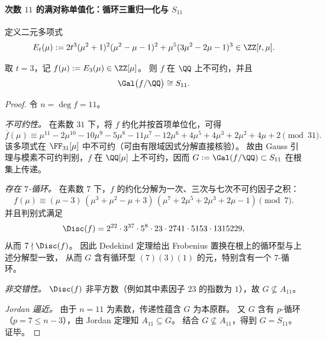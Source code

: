 \paragraph{次数 \texorpdfstring{$11$}{11} 的满对称单值化：循环三重归一化与 \texorpdfstring{$S_{11}$}{S11}}
定义二元多项式
\[
E_t(\mu):=
2t^3(\mu^2+1)^2(\mu^2-\mu-1)^2+\mu^5(3\mu^2-2\mu-1)^3\in\ZZ[t,\mu].
\]

\begin{theorem}\label{thm:xi-degree11-Et-specialization-galois-S11}
取 \(t=3\)，记 \(f(\mu):=E_3(\mu)\in\ZZ[\mu]\)。
则 \(f\) 在 \(\QQ\) 上不可约，并且
\[
\Gal\bigl(f/\QQ\bigr)\cong S_{11}.
\]
\end{theorem}
\begin{proof}
令 \(n=\deg f=11\)。
\par
\emph{不可约性。}
在素数 \(31\) 下，将 \(f\) 约化并按首项单位化，可得
\[
\overline f(\mu)\equiv \mu^{11}-2\mu^{10}-10\mu^9-5\mu^8-11\mu^7-12\mu^6+4\mu^5+4\mu^3+2\mu^2+4\mu+2\pmod{31}.
\]
该多项式在 \(\FF_{31}[\mu]\) 中不可约（可由有限域因式分解直接核验）。
故由 Gauss 引理与模素不可约判别，\(f\) 在 \(\QQ[\mu]\) 上不可约，因而 \(G:=\Gal(f/\QQ)\subset S_{11}\) 在根集上传递。
\par
\emph{存在 \texorpdfstring{$7$}{7}-循环。}
在素数 \(7\) 下，\(f\) 的约化分解为一次、三次与七次不可约因子之积：
\[
f(\mu)\equiv (\mu-3)\,(\mu^3+\mu^2-\mu+3)\,(\mu^7+2\mu^5+2\mu^3+2\mu-1)\pmod 7.
\]
并且判别式满足
\[
\Disc(f)=2^{22}\cdot 3^{37}\cdot 5^{8}\cdot 23\cdot 2741\cdot 5153\cdot 1315229,
\]
从而 \(7\nmid \Disc(f)\)。
因此 Dedekind 定理给出 Frobenius 置换在根上的循环型与上述分解型一致，
从而 \(G\) 含有循环型 \((7)(3)(1)\) 的元，特别含有一个 \(7\)-循环。
\par
\emph{非交错性。}
\(\Disc(f)\) 非平方数（例如其中素因子 \(23\) 的指数为 \(1\)），故 \(G\nsubseteq A_{11}\)。
\par
\emph{Jordan 逼近。}
由于 \(n=11\) 为素数，传递性蕴含 \(G\) 为本原群。
又 \(G\) 含有 \(p\)-循环（\(p=7\le n-3\)），由 Jordan 定理知 \(A_{11}\subseteq G\)。
结合 \(G\nsubseteq A_{11}\)，得到 \(G=S_{11}\)。证毕。
\end{proof}

